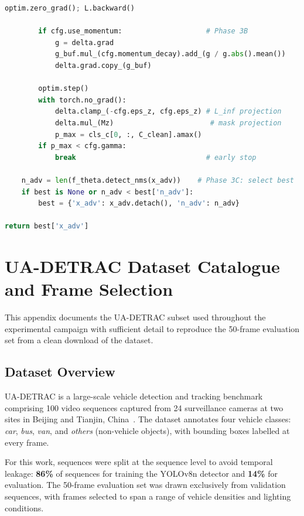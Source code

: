 \documentclass[12pt,a4paper]{report}
\begin{document}
\begin{lstlisting}[language=Python,
  caption={Phase 3 latent attack -- full loop including extensions 3A--3D.}]
        optim.zero_grad(); L.backward()

        if cfg.use_momentum:                    # Phase 3B
            g = delta.grad
            g_buf.mul_(cfg.momentum_decay).add_(g / g.abs().mean())
            delta.grad.copy_(g_buf)

        optim.step()
        with torch.no_grad():
            delta.clamp_(-cfg.eps_z, cfg.eps_z) # L_inf projection
            delta.mul_(Mz)                       # mask projection
            p_max = cls_c[0, :, C_clean].amax()
        if p_max < cfg.gamma:
            break                               # early stop

    n_adv = len(f_theta.detect_nms(x_adv))    # Phase 3C: select best
    if best is None or n_adv < best['n_adv']:
        best = {'x_adv': x_adv.detach(), 'n_adv': n_adv}

return best['x_adv']
\end{lstlisting}


\chapter{UA-DETRAC Dataset Catalogue and Frame Selection}
\label{app:dataset}

This appendix documents the UA-DETRAC subset used throughout the
experimental campaign with sufficient detail to reproduce the 50-frame
evaluation set from a clean download of the dataset.

\section{Dataset Overview}

UA-DETRAC is a large-scale vehicle detection and tracking benchmark
comprising 100 video sequences captured from 24 surveillance cameras at
two sites in Beijing and Tianjin, China~\cite{wen2015ua}.  The dataset
annotates four vehicle classes: \emph{car}, \emph{bus}, \emph{van}, and
\emph{others} (non-vehicle objects), with bounding boxes labelled at
every frame.

For this work, sequences were split at the sequence level to avoid
temporal leakage: \textbf{86\%} of sequences for training the
YOLOv8n detector and \textbf{14\%} for evaluation.  The 50-frame
evaluation set was drawn exclusively from validation sequences, with
frames selected to span a range of vehicle densities and lighting
conditions.
\end{document}

